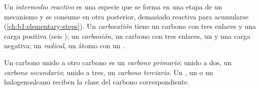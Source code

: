 \begin{definition}\label{def:b1:electronic-effects:intermediates}
Un \emph{intermedio reactivo} es una especie
que se forma en una etapa de un mecanismo y se consume en otra
posterior, demasiado reactiva para acumularse
(\cref{ch:b1:elementary-steps}). Un \emph{carbocatión}
tiene un carbono con tres enlaces y una carga positiva (seis ); un \emph{carbanión}, un carbono con tres enlaces, un
 y una carga negativa; un \emph{radical},
un átomo con un .
\end{definition}

\begin{definition}\label{def:b1:electronic-effects:carbon-class}
Un carbono unido a otro carbono es un \emph{carbono
primario}; unido a dos, un \emph{carbono
secundario}; unido a tres, un \emph{carbono
terciario}. Un , un  o un
halogenoalcano reciben la clase del carbono correspondiente.
\end{definition}

